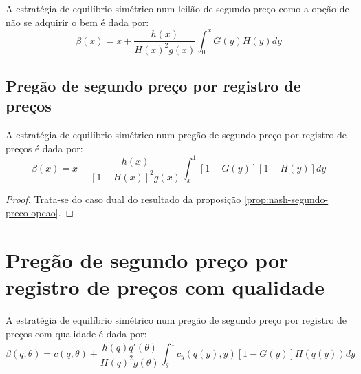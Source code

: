 \begin{proposicao}
	\label{prop:nash-segundo-preco-opcao}
	A estratégia de equilíbrio simétrico num leilão de segundo preço como a opção de não se adquirir o bem é dada por:
	\begin{equation}
		\beta(x) = x + \frac{h(x)}{H(x)^2 g(x)} \int_0^x G(y)H(y)dy
	\end{equation}
\end{proposicao}

\subsection{Pregão de segundo preço por registro de preços}

\begin{proposicao}
	\label{prop:nash-pregao-segundo-preco-rp}
	A estratégia de equilíbrio simétrico num pregão de segundo preço por registro de preços é dada por:
	\begin{equation}
		\beta(x) = x - \frac{h(x)}{[1-H(x)]^2 g(x)} \int_x^1 [1-G(y)][1-H(y)]dy
	\end{equation}
\end{proposicao}
\begin{proof}
	Trata-se do caso dual do resultado da proposição \ref{prop:nash-segundo-preco-opcao}.
\end{proof}

\section{Pregão de segundo preço por registro de preços com qualidade}

\begin{proposicao}
	\label{prop:nash-pregao-segundo-preco-qualidade}
	A estratégia de equilíbrio simétrico num pregão de segundo preço por registro de preços com qualidade é dada por:
	\begin{equation}
		\beta(q, \theta) = c(q, \theta) + \frac{h(q)q'(\theta)}{H(q)^2g(\theta)}\int_{\theta}^1 c_{y}(q(y), y)[1-G(y)]H(q(y))dy
	\end{equation}
\end{proposicao}